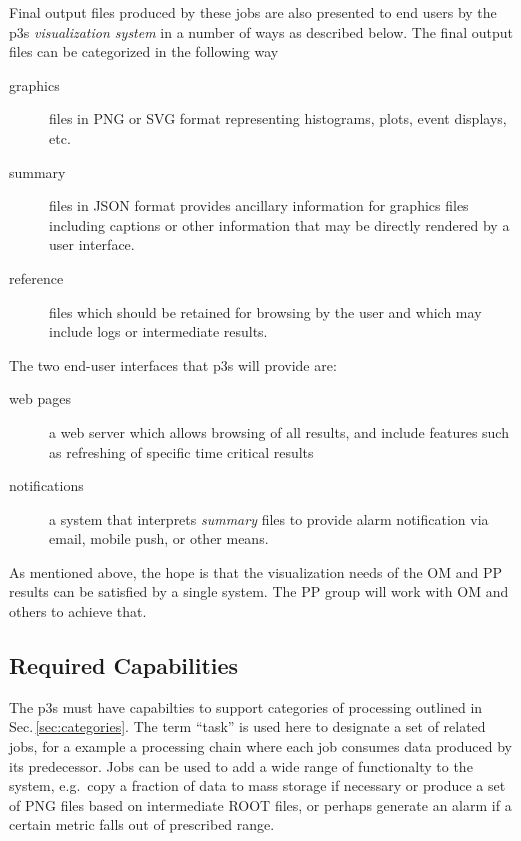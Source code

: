 \documentclass[pdftex,12pt,letter]{article}
\begin{document}
Final output files produced by these jobs are also presented to end
users by the p3s \textit{visualization system} in a number of ways as
described below.  The final output files can be categorized in the
following way

\begin{description}
\item[graphics] files in PNG or SVG format representing histograms, plots, event displays, etc.
\item[summary] files in JSON format provides ancillary information for graphics files including captions or other information that may be directly rendered by a user interface.
\item[reference] files which should be retained for browsing by the user and which may include logs or intermediate results. 
\end{description}

\noindent The two end-user interfaces that p3s will provide are:

\begin{description}
\item[web pages] a web server which allows browsing of all results, and include features such as refreshing of specific time critical results
\item[notifications] a system that interprets \textit{summary} files to provide alarm notification via email, mobile push, or other means.
\end{description}

\noindent As mentioned above, the hope is that the visualization needs
of the OM and PP results can be satisfied by a single system.  The PP
group will work with OM and others to achieve that.


\subsection{Required Capabilities}
\label{sec:capabilities}

The p3s must have capabilties to support categories of processing outlined
in Sec.\,\ref{sec:categories}. The term ``task'' is used here to designate a set
of related jobs, for a example a processing chain where each job consumes
data produced by its predecessor. Jobs can be used to add a wide range
of functionalty to the system, e.g.~copy a fraction of data to mass storage
if necessary or produce a set of PNG files based on intermediate ROOT files,
or perhaps generate an alarm if a certain metric falls out of prescribed range.
\end{document}
